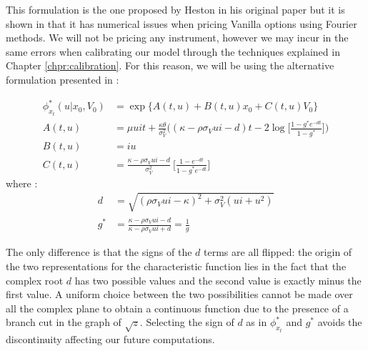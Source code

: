 This formulation is the one proposed by Heston in his original paper \cite{HESTON93} but it is shown in \cite{HESTONTRAP}  that it has numerical issues when  pricing Vanilla options using Fourier methods. We will not be pricing any instrument, however we may incur in the same errors when calibrating our model through the techniques explained in Chapter \ref{chpr:calibration}. For this reason, we will be using the alternative formulation presented in \cite{HESTONTRAP}:




\begin{equation}
\begin{split}
\label{eq:heston_chf_trap}
\phi_{x_t}^*(u| x_0, V_0) &= \exp\{A(t,u) + B(t,u) x_0 + C(t,u) V_0\}\\
A(t,u) &= \mu u i t +  \frac{\kappa\theta}{\sigma_V^2} \bigg( (\kappa - \rho\sigma_V u i - d)t - 2 \log\Big[  \frac{1-g^*e^{-dt}}{1-g^*} \Big] \bigg)\\
B(t,u) &= i u \\
C(t,u)&= \frac{\kappa - \rho\sigma_V u i - d}{\sigma_V^2} \:\Big[\frac{1-e^{-dt}}{1-g^*e^{-dt}}\Big]
\end{split}
\end{equation} 
where :
\begin{equation*}
\begin{split}
d&=\sqrt{(\rho \sigma_V u i - \kappa)^2 + \sigma_V^2(u i + u^2)}\\
g^*&= \frac{\kappa - \rho\sigma_V u i - d}{\kappa - \rho\sigma_V u i + d} = \frac{1}{g}
\end{split}
\end{equation*} 

The only difference is that the signs of the $d$ terms are all flipped: the origin of the two representations for the characteristic function lies in the fact that the complex root $d$ has two possible values and the second value is exactly minus the first value.
A uniform choice between the two possibilities cannot be made over all the complex plane to obtain a continuous function due to the presence of a branch cut in the graph of $\sqrt{z}$. Selecting the sign of $d$ as in $\phi_{x_t}^*$ and $g^*$ avoids the discontinuity affecting our future computations.

